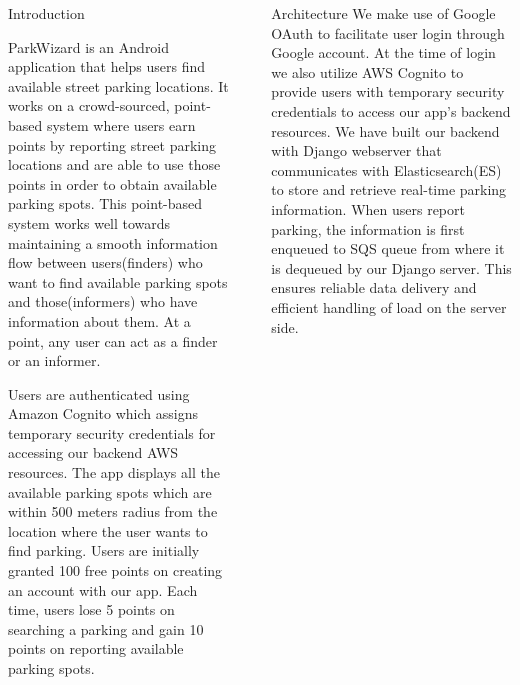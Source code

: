 \documentclass[final]{beamer}
\newlength{\sepwid}
\newlength{\onecolwid}
\begin{document}
\begin{frame}[t]
\begin{columns}[t]
\begin{column}{\onecolwid}
\begin{block}{Introduction}

ParkWizard is an Android application that helps users find available street parking locations. It works on a crowd-sourced, point-based system where users earn points by reporting street parking locations and are able to use those points in order to obtain available parking spots. This point-based system works well towards maintaining a smooth information flow between users(finders) who want to find available parking spots and those(informers) who have information about them. At a point, any user can act as a finder or an informer. 


Users are authenticated using Amazon Cognito which assigns temporary security credentials for accessing our backend AWS resources. The app displays all the available parking spots which are within 500 meters radius from the location where the user wants to find parking. Users are initially granted 100 free points on creating an account with our app. Each time, users lose 5 points on searching a parking and gain 10 points on reporting available parking spots.
\end{block}




\end{column} %

\begin{column}{\sepwid}\end{column} %

\begin{column}{\onecolwid} %

\begin{block}{Architecture}
We make use of Google OAuth to facilitate user login through Google account. At the time of login we also utilize AWS Cognito to provide users with temporary security credentials to access our app's backend resources. We have built our backend with Django webserver that communicates with Elasticsearch(ES) to store and retrieve real-time parking information. When users report parking, the information is first enqueued to SQS queue from where it is dequeued by our Django server. This ensures reliable data delivery and efficient handling of load on the server side. 


\end{block}
\end{column}
\end{columns}
\end{frame}
\end{document}
